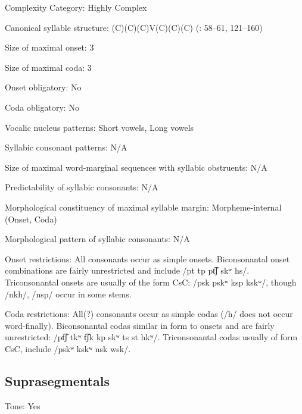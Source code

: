 {\begin{appendixdesc}
\item[Complexity Category:] Highly Complex

\item[Canonical syllable structure:] (C)(C)(C)V(C)(C)(C) (\citealt{LeSourd1993}: 58--61, 121--160)

\item[Size of maximal onset:] 3

\item[Size of maximal coda:] 3

\item[Onset obligatory:] No

\item[Coda obligatory:] No

\item[Vocalic nucleus patterns:] Short vowels, Long vowels

\item[Syllabic consonant patterns:] N/A

\item[Size of maximal word-marginal sequences with syllabic obstruents:] N/A

\item[Predictability of syllabic consonants:] N/A

\item[Morphological constituency of maximal syllable margin:] Morpheme-internal (Onset, Coda)

\item[Morphological pattern of syllabic consonants:] N/A

\item[Onset restrictions:] All consonants occur as simple onsets. Biconsonantal onset combinations are fairly unrestricted and include /pt tp pt͡ʃ skʷ hs/. Triconsonantal onsets are usually of the form CsC: /psk pskʷ ksp kskʷ/, though /nkh/, /nsp/ occur in some stems.

\item[Coda restrictions:] All(?) consonants occur as simple codas (/h/ does not occur word-finally). Biconsonantal codas similar in form to onsets and are fairly unrestricted: /pt͡ʃ tkʷ t͡ʃk kp skʷ ts st hkʷ/. Triconsonantal codas usually of form CsC, include /pskʷ kskʷ nsk wsk/.
\end{appendixdesc}
\subsection*{Suprasegmentals}
\begin{appendixdesc}
\item[Tone:] Yes


\end{appendixdesc}}
